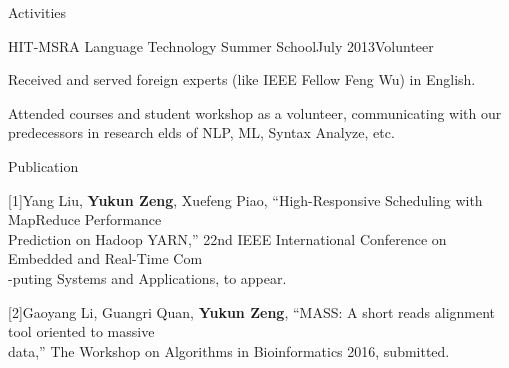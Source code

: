 \documentclass{resume} %
\newcommand{\tab}[1]{\hspace{.2667\textwidth}\rlap{#1}}
\newcommand{\itab}[1]{\hspace{0em}\rlap{#1}}
\begin{document}
\begin{rSection}{Activities}


\begin{rSubsection}{HIT-MSRA Language Technology Summer School}{July 2013}{Volunteer}{}
\item Received and served foreign experts (like IEEE Fellow Feng Wu) in English.
\item Attended courses and student workshop as a volunteer, communicating with our predecessors in research elds
of NLP, ML, Syntax Analyze, etc.
\end{rSubsection}



\end{rSection}

\begin{rSection}{Publication}

{[1]Yang Liu, }{\bf Yukun Zeng}{, Xuefeng Piao, ``High-Responsive Scheduling with MapReduce Performance}
\\{Prediction on Hadoop YARN,'' 22nd IEEE International Conference on Embedded and Real-Time Com}
\\{-puting Systems and Applications, to appear.}

{[2]Gaoyang Li, Guangri Quan, }{\bf Yukun Zeng}{, ``MASS: A short reads alignment tool oriented to massive}
\\{data,'' The Workshop on Algorithms in Bioinformatics 2016, submitted.}

\end{rSection}
\end{document}
